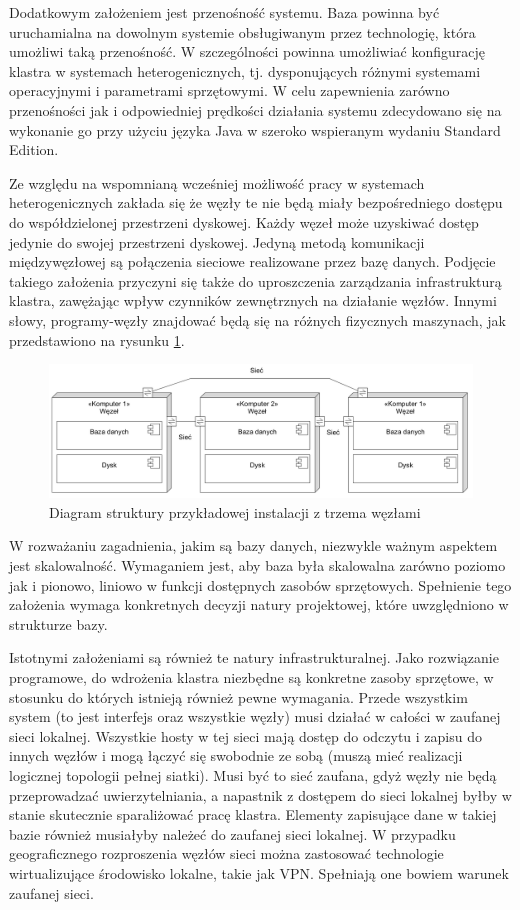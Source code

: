 \documentclass[a4paper,polish,12pt,twoside]{article}
\begin{document}
Dodatkowym założeniem jest przenośność systemu. Baza powinna być uruchamialna na dowolnym systemie obsługiwanym przez technologię, która umożliwi taką przenośność. W szczególności powinna umożliwiać konfigurację klastra w systemach heterogenicznych, tj. dysponujących różnymi systemami operacyjnymi i parametrami sprzętowymi. W celu zapewnienia zarówno przenośności jak i odpowiedniej prędkości działania systemu zdecydowano się na wykonanie go przy użyciu języka Java w szeroko wspieranym wydaniu Standard Edition.

Ze względu na wspomnianą wcześniej możliwość pracy w systemach heterogenicznych zakłada się że węzły te nie będą miały bezpośredniego dostępu do współdzielonej przestrzeni dyskowej. Każdy węzeł może uzyskiwać dostęp jedynie do swojej przestrzeni dyskowej. Jedyną metodą komunikacji międzywęzłowej są połączenia sieciowe realizowane przez bazę danych.  Podjęcie takiego założenia przyczyni się także do uproszczenia zarządzania infrastrukturą klastra, zawężając wpływ czynników zewnętrznych na działanie węzłów. Innymi słowy, programy-węzły znajdować będą się na różnych fizycznych maszynach, jak przedstawiono na rysunku \ref{fig:deployment_schema}.

	\begin{figure}[h]
		\centering \includegraphics[width=15cm]{deployment_schema}
		\caption{Diagram struktury przykładowej instalacji z trzema węzłami}
		\label{fig:deployment_schema}
	\end{figure}

W rozważaniu zagadnienia, jakim są bazy danych, niezwykle ważnym aspektem jest skalowalność. Wymaganiem jest, aby baza była skalowalna zarówno poziomo jak i pionowo, liniowo w funkcji dostępnych zasobów sprzętowych. Spełnienie tego założenia wymaga konkretnych decyzji natury projektowej, które uwzględniono w strukturze bazy.

Istotnymi założeniami są również te natury infrastrukturalnej. Jako rozwiązanie programowe, do wdrożenia klastra niezbędne są konkretne zasoby sprzętowe, w stosunku do których istnieją również pewne wymagania. Przede wszystkim system (to jest interfejs oraz wszystkie węzły) musi działać w całości w zaufanej sieci lokalnej. Wszystkie hosty w tej sieci mają dostęp do odczytu i zapisu do innych węzłów i mogą łączyć się swobodnie ze sobą (muszą mieć realizacji logicznej topologii pełnej siatki). Musi być to sieć zaufana, gdyż węzły nie będą przeprowadzać uwierzytelniania, a napastnik z dostępem do sieci lokalnej byłby w stanie skutecznie sparaliżować pracę klastra. Elementy zapisujące dane w takiej bazie również musiałyby należeć do zaufanej sieci lokalnej. W przypadku geograficznego rozproszenia węzłów sieci można zastosować technologie wirtualizujące środowisko lokalne, takie jak VPN. Spełniają one bowiem warunek zaufanej sieci.
\end{document}
